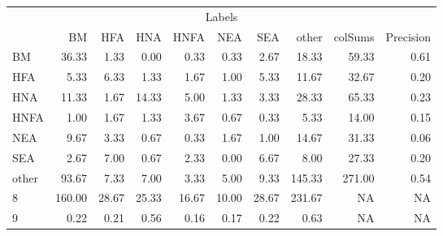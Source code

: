 \begin{table}
\centering\begingroup\fontsize{11}{13}\selectfont

\begin{tabular}{lrrrrrr>{}r|rr}
\toprule
\multicolumn{10}{c}{Labels} \\
\cmidrule(l{3pt}r{3pt}){1-10}
  & BM & HFA & HNA & HNFA & NEA & SEA & other & colSums & Precision\\
\midrule
BM & 36.33 & 1.33 & 0.00 & 0.33 & 0.33 & 2.67 & 18.33 & 59.33 & 0.61\\
HFA & 5.33 & 6.33 & 1.33 & 1.67 & 1.00 & 5.33 & 11.67 & 32.67 & 0.20\\
HNA & 11.33 & 1.67 & 14.33 & 5.00 & 1.33 & 3.33 & 28.33 & 65.33 & 0.23\\
HNFA & 1.00 & 1.67 & 1.33 & 3.67 & 0.67 & 0.33 & 5.33 & 14.00 & 0.15\\
NEA & 9.67 & 3.33 & 0.67 & 0.33 & 1.67 & 1.00 & 14.67 & 31.33 & 0.06\\
\addlinespace
SEA & 2.67 & 7.00 & 0.67 & 2.33 & 0.00 & 6.67 & 8.00 & 27.33 & 0.20\\
other & 93.67 & 7.33 & 7.00 & 3.33 & 5.00 & 9.33 & 145.33 & 271.00 & 0.54\\
8 & 160.00 & 28.67 & 25.33 & 16.67 & 10.00 & 28.67 & 231.67 & NA & NA\\
9 & 0.22 & 0.21 & 0.56 & 0.16 & 0.17 & 0.22 & 0.63 & NA & NA\\
\bottomrule
\end{tabular}
\endgroup{}
\end{table}
